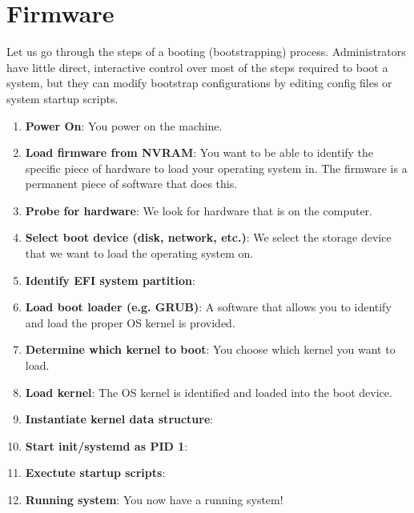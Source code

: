 \documentclass{article}
\begin{document}
\section{Firmware} 

  Let us go through the steps of a booting (bootstrapping) process. Administrators have little direct, interactive control over most of the steps required to boot a system, but they can modify bootstrap configurations by editing config files or system startup scripts. 

  \begin{enumerate}
    \item \textbf{Power On}: You power on the machine. 
    \item \textbf{Load firmware from NVRAM}: You want to be able to identify the specific piece of hardware to load your operating system in. The firmware is a permanent piece of software that does this. 
    \item \textbf{Probe for hardware}: We look for hardware that is on the computer. 
    \item \textbf{Select boot device (disk, network, etc.)}: We select the storage device that we want to load the operating system on. 
    \item \textbf{Identify EFI system partition}: 
    \item \textbf{Load boot loader (e.g. GRUB)}: A software that allows you to identify and load the proper OS kernel is provided. 
    \item \textbf{Determine which kernel to boot}: You choose which kernel you want to load.  
    \item \textbf{Load kernel}: The OS kernel is identified and loaded into the boot device. 
    \item \textbf{Instantiate kernel data structure}: 
    \item \textbf{Start init/systemd as PID 1}: 
    \item \textbf{Exectute startup scripts}:
    \item \textbf{Running system}: You now have a running system! 
  \end{enumerate}
\end{document}

